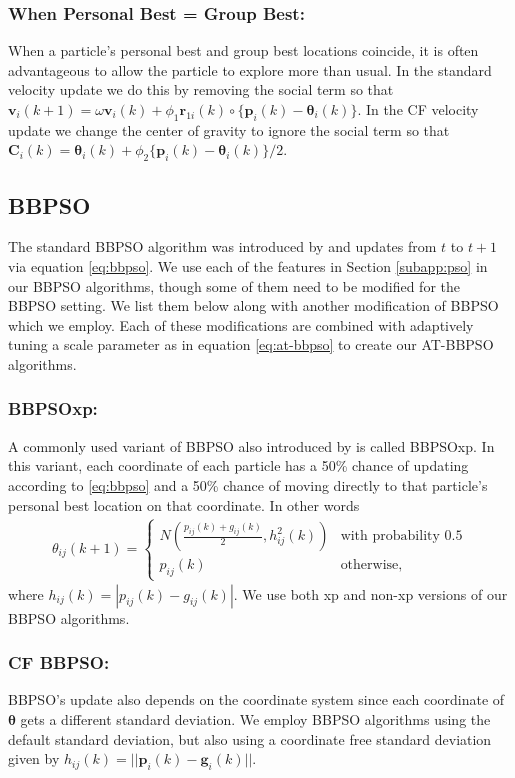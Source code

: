 \documentclass[cmbright]{staauth}
\begin{document}
\subsubsection{When Personal Best = Group Best:}
When a particle's personal best and group best locations coincide, it is often advantageous to allow the particle to explore more than usual. In the standard velocity update we do this by removing the social term so that $\bm{v}_i(k+1) = \omega \bm{v}_i(k) + \phi_1 \bm{r}_{1i}(k)\circ\{\bm{p}_i(k) - \bm{\theta}_i(k)\}$. In the CF velocity update we change the center of gravity to ignore the social term so that $\bm{C}_i(k) = \bm{\theta}_i(k) + \phi_2\{\bm{p}_i(k) - \bm{\theta}_i(k)\}/2$.

\subsection{BBPSO}\label{subapp:bbpso}
The standard BBPSO algorithm was introduced by \citet{kennedy2003bare} and updates from $t$ to $t+1$ via equation \eqref{eq:bbpso}. We use each of the features in Section \ref{subapp:pso} in our BBPSO algorithms, though some of them need to be modified for the BBPSO setting. We list them below along with another modification of BBPSO which we employ. Each of these modifications are combined with adaptively tuning a scale parameter as in equation \eqref{eq:at-bbpso} to create our AT-BBPSO algorithms.

\subsubsection{BBPSOxp:}
A commonly used variant of BBPSO also introduced by \citet{kennedy2003bare} is called BBPSOxp. In this variant, each coordinate of each particle has a 50\% chance of updating according to \eqref{eq:bbpso} and a 50\% chance of moving directly to that particle's personal best location on that coordinate. In other words
\begin{align}\label{eq:bbpsoxp}
\theta_{ij}(k+1) = \begin{cases} N\left(\frac{p_{ij}(k) + g_{ij}(k)}{2}, h^2_{ij}(k)\right) & \mbox{with probability }0.5\\
p_{ij}(k) &\mbox{otherwise,}\end{cases}
\end{align}
where $h_{ij}(k) = |p_{ij}(k) - g_{ij}(k)|$. We use both xp and non-xp versions of our BBPSO algorithms.

\subsubsection{CF BBPSO:}
BBPSO's update also depends on the coordinate system since each coordinate of $\bm{\theta}$ gets a different standard deviation. We employ BBPSO algorithms using the default standard deviation, but also using a coordinate free standard deviation given by $h_{ij}(k) = ||\bm{p}_i(k) - \bm{g}_i(k)||$.
\end{document}
